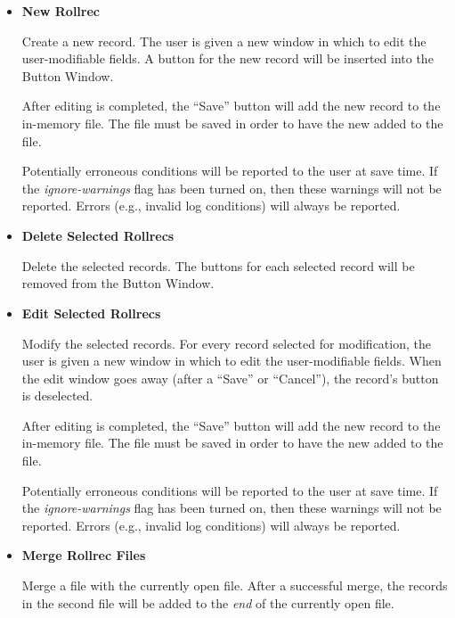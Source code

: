 \begin{itemize}

\item {\bf New Rollrec}\verb" "

Create a new  record.   The user is given a new window in
which to edit the user-modifiable  fields.  A button for the
new  record will be inserted into the Button Window.

After editing is completed, the ``Save'' button will add the new
 record to the in-memory  file.  The file
must be saved in order to have the new  added to the file.

Potentially erroneous conditions will be reported to the user at save time.
If the {\it ignore-warnings} flag has been turned on, then these warnings will
not be reported.  Errors (e.g., invalid log conditions) will always be
reported.

\item {\bf Delete Selected Rollrecs}\verb" "

Delete the selected  records.  The buttons for each selected
record will be removed from the Button Window.

\item {\bf Edit Selected Rollrecs}\verb" "

Modify the selected  records.   For every record selected for
modification, the user is given a new window in which to edit the
user-modifiable  fields.  When the edit window goes away
(after a ``Save'' or ``Cancel''), the  record's button is
deselected.

After editing is completed, the ``Save'' button will add the new
 record to the in-memory  file.  The file
must be saved in order to have the new  added to the file.

Potentially erroneous conditions will be reported to the user at save time.  
If the {\it ignore-warnings} flag has been turned on, then these warnings will
not be reported.  Errors (e.g., invalid log conditions) will always be
reported.

\item {\bf Merge Rollrec Files}\verb" "

Merge a  file with the currently open  file.
After a successful merge, the  records in the second file will
be added to the {\it end} of the currently open  file.


\end{itemize}
